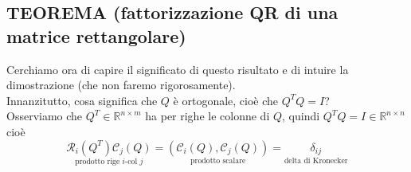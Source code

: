 \documentclass[12pt,a4paper]{article}
\begin{document}
\subsection{TEOREMA (fattorizzazione QR di una matrice rettangolare)}
\begin{center}
\end{center}
Cerchiamo ora di capire il significato di questo risultato e di intuire la dimostrazione (che non faremo rigorosamente). \\
Innanzitutto, cosa significa che $Q$ è ortogonale, cioè che $Q^TQ=I$?\\
Osserviamo che $Q^T\in \mathbb{R}^{n\times m}$ ha per righe le colonne di $Q$, quindi $Q^TQ=I\in \mathbb{R}^{n\times n}$ cioè
\begin{equation*}
    \underset{\text{prodotto rige $i$-col $j$}}{\mathcal{R}_i(Q^T)\mathcal{C}_j(Q)}=\underset{\text{prodotto scalare}}{(\mathcal{C}_i(Q),\mathcal{C}_j(Q))}=\underset{\text{delta di Kronecker}}{\delta_{ij}}
\end{equation*}
\end{document}
